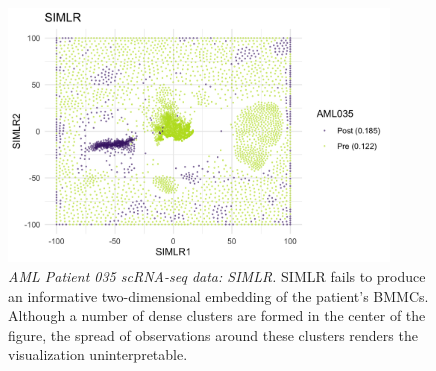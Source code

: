 \documentclass{article}
\begin{document}
\begin{figure}[!htbp]
    \centering
    \includegraphics[width=0.9\textwidth]{figures/aml035_SIMLR.png}
    \caption{
    {\em AML Patient 035 scRNA-seq data: SIMLR.} SIMLR fails to produce an informative two-dimensional embedding of the patient's BMMCs. Although a number of dense clusters are formed in the center of the figure, the spread of observations around these clusters renders the visualization uninterpretable.}
    \label{fig:SIMLR_aml_035}
\end{figure}
\end{document}
